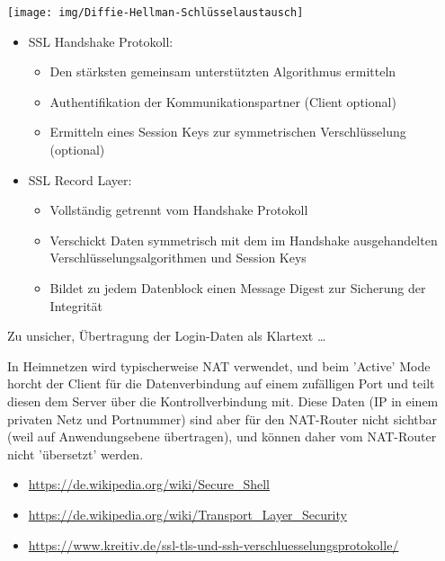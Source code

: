 \medskip
\texttt{[image: img/Diffie-Hellman-Schlüsselaustausch]}

\begin{itemize}
    \item SSL Handshake Protokoll:
    \begin{itemize}
        \item Den stärksten gemeinsam unterstützten Algorithmus ermitteln
        \item Authentifikation der Kommunikationspartner (Client optional)
        \item Ermitteln eines Session Keys zur symmetrischen Verschlüsselung (optional)
    \end{itemize}
    \item SSL Record Layer:
    \begin{itemize}
        \item Vollständig getrennt vom Handshake Protokoll
        \item Verschickt Daten symmetrisch mit dem im Handshake ausgehandelten Verschlüsselungsalgorithmen und Session Keys
        \item Bildet zu jedem Datenblock einen Message Digest zur Sicherung der Integrität
    \end{itemize}
\end{itemize}

Zu unsicher, Übertragung der Login-Daten als Klartext \ldots

In Heimnetzen wird typischerweise NAT verwendet, und beim 'Active' Mode horcht der Client für die Datenverbindung auf einem zufälligen Port und teilt diesen dem Server über die Kontrollverbindung mit.
Diese Daten (IP in einem privaten Netz und Portnummer) sind aber für den NAT-Router nicht sichtbar (weil auf Anwendungsebene übertragen), und können daher vom NAT-Router nicht 'übersetzt' werden.

\begin{itemize}
    \item \url{https://de.wikipedia.org/wiki/Secure_Shell}
    \item \url{https://de.wikipedia.org/wiki/Transport_Layer_Security}
    \item \url{https://www.kreitiv.de/ssl-tls-und-ssh-verschluesselungsprotokolle/}
\end{itemize}

